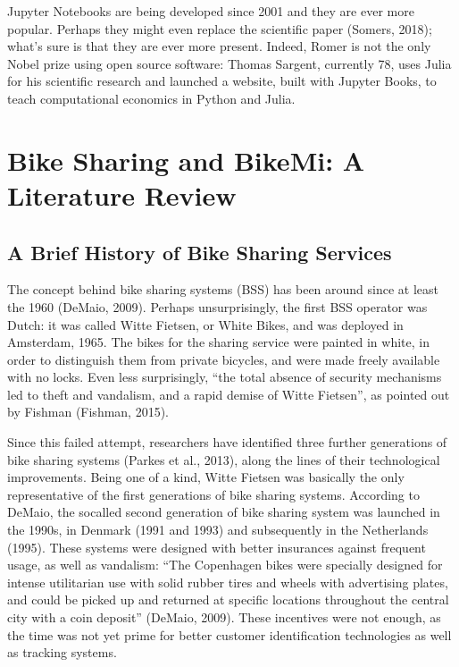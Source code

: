 \documentclass[letterpaper,10pt,english]{jupyterBook}
\begin{document}
\sphinxAtStartPar
Jupyter Notebooks are being developed since 2001 and they are ever more popular. Perhaps they might even replace the scientific paper (Somers, 2018); what’s sure is that they are ever more present. Indeed, Romer is not the only Nobel prize using open source software: Thomas Sargent, currently 78, uses Julia for his scientific research and launched a website,  built with Jupyter Books, to teach computational economics in Python and Julia.


\chapter{Bike Sharing and BikeMi: A Literature Review}
\label{\detokenize{02-bikesharing_and_bikemi:bike-sharing-and-bikemi-a-literature-review}}\label{\detokenize{02-bikesharing_and_bikemi::doc}}

\section{A Brief History of Bike Sharing Services}
\label{\detokenize{02-bikesharing_and_bikemi:a-brief-history-of-bike-sharing-services}}
\sphinxAtStartPar
The concept behind bike sharing systems (BSS) has been around since at least the 1960 (DeMaio, 2009). Perhaps unsurprisingly, the first BSS operator was Dutch: it was called Witte Fietsen, or White Bikes, and was deployed in Amsterdam, 1965. The bikes for the sharing service were painted in white, in order to distinguish them from private bicycles, and were made freely available with no locks. Even less surprisingly, “the total absence of security mechanisms led to theft and vandalism, and a rapid demise of Witte Fietsen”, as pointed out by Fishman (Fishman, 2015).

\sphinxAtStartPar
Since this failed attempt, researchers have identified three further generations of bike sharing systems (Parkes et al., 2013), along the lines of their technological improvements. Being one of a kind, Witte Fietsen was basically the only representative of the first generations of bike sharing systems. According to DeMaio, the so\sphinxhyphen{}called second generation of bike sharing system was launched in the 1990s, in Denmark (1991 and 1993) and subsequently in the Netherlands (1995). These systems were designed with better insurances against frequent usage, as well as vandalism: “The Copenhagen bikes were specially designed for intense utilitarian use with solid rubber tires and wheels with advertising plates, and could be picked up and returned at specific locations throughout the central city with a coin deposit” (DeMaio, 2009). These incentives were not enough, as the time was not yet prime for better customer identification technologies as well as tracking systems.
\end{document}
